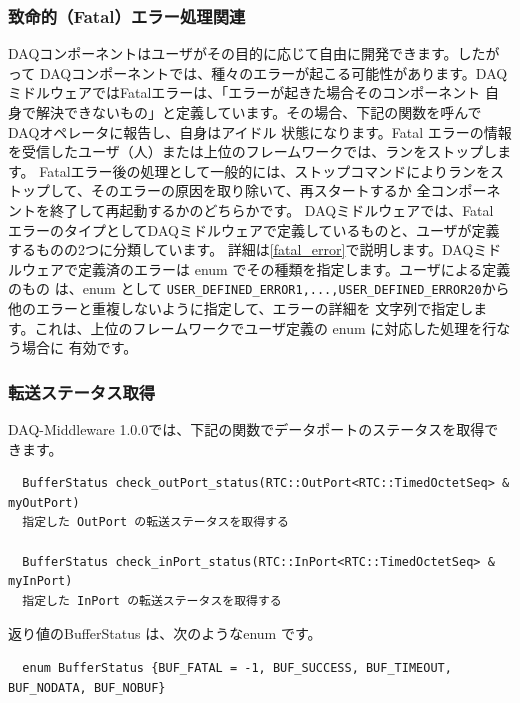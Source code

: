 \documentclass[a4j,10pt,dvips,onecolumn,oneside,final]{jarticle}%
\begin{document}
\subsubsection{致命的（Fatal）エラー処理関連}\label{fatal}
DAQコンポーネントはユーザがその目的に応じて自由に開発できます。したがって
DAQコンポーネントでは、種々のエラーが起こる可能性があります。DAQミドルウェアではFatalエラーは、「エラーが起きた場合そのコンポーネント
自身で解決できないもの」と定義しています。その場合、下記の関数を呼んでDAQオペレータに報告し、自身はアイドル
状態になります。Fatal エラーの情報を受信したユーザ（人）または上位のフレームワークでは、ランをストップします。
Fatalエラー後の処理として一般的には、ストップコマンドによりランをストップして、そのエラーの原因を取り除いて、再スタートするか
全コンポーネントを終了して再起動するかのどちらかです。
DAQミドルウェアでは、Fatal エラーのタイプとしてDAQミドルウェアで定義しているものと、ユーザが定義するものの2つに分類しています。
詳細は\ref{fatal_error}で説明します。DAQミドルウェアで定義済のエラーは enum でその種類を指定します。ユーザによる定義のもの
は、enum として \verb|USER_DEFINED_ERROR1,...,USER_DEFINED_ERROR20|から他のエラーと重複しないように指定して、エラーの詳細を
文字列で指定します。これは、上位のフレームワークでユーザ定義の enum に対応した処理を行なう場合に
有効です。

\subsubsection{転送ステータス取得}\label{portstat}
DAQ-Middleware 1.0.0では、下記の関数でデータポートのステータスを取得できます。
\begin{Verbatim}  
  BufferStatus check_outPort_status(RTC::OutPort<RTC::TimedOctetSeq> & myOutPort) 
  指定した OutPort の転送ステータスを取得する

  BufferStatus check_inPort_status(RTC::InPort<RTC::TimedOctetSeq> & myInPort)
  指定した InPort の転送ステータスを取得する    
\end{Verbatim}
返り値のBufferStatus は、次のようなenum です。
\begin{Verbatim}
  enum BufferStatus {BUF_FATAL = -1, BUF_SUCCESS, BUF_TIMEOUT, BUF_NODATA, BUF_NOBUF}
\end{Verbatim}
\end{document}
